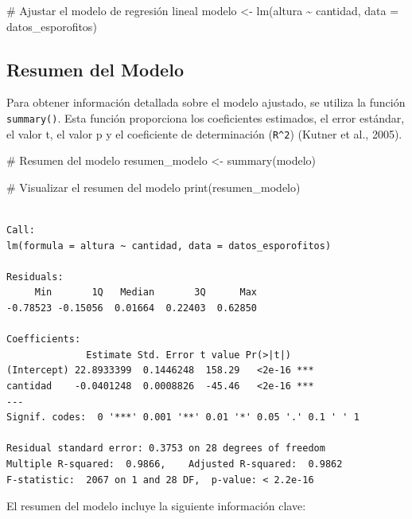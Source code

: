 \documentclass[
  spanish,
  a4paper,
  DIV=11,
  numbers=noendperiod,
  onepage,
  openany]{scrreprt}
\newenvironment{Shaded}{\begin{snugshade}}{\end{snugshade}}
\newcommand{\AttributeTok}[1]{\textcolor[rgb]{0.40,0.45,0.13}{#1}}
\newcommand{\CommentTok}[1]{\textcolor[rgb]{0.37,0.37,0.37}{#1}}
\newcommand{\FunctionTok}[1]{\textcolor[rgb]{0.28,0.35,0.67}{#1}}
\newcommand{\NormalTok}[1]{\textcolor[rgb]{0.00,0.23,0.31}{#1}}
\newcommand{\OtherTok}[1]{\textcolor[rgb]{0.00,0.23,0.31}{#1}}
\newcommand{\SpecialCharTok}[1]{\textcolor[rgb]{0.37,0.37,0.37}{#1}}
\begin{document}
\begin{Shaded}
\begin{Highlighting}[]
\CommentTok{\# Ajustar el modelo de regresión lineal}
\NormalTok{modelo }\OtherTok{\textless{}{-}} \FunctionTok{lm}\NormalTok{(altura }\SpecialCharTok{\textasciitilde{}}\NormalTok{ cantidad, }\AttributeTok{data =}\NormalTok{ datos\_esporofitos)}
\end{Highlighting}
\end{Shaded}

\subsection{Resumen del Modelo}\label{resumen-del-modelo}

Para obtener información detallada sobre el modelo ajustado, se utiliza
la función \texttt{summary()}. Esta función proporciona los coeficientes
estimados, el error estándar, el valor t, el valor p y el coeficiente de
determinación (\texttt{R\^{}2}) (Kutner et al., 2005).

\begin{Shaded}
\begin{Highlighting}[]
\CommentTok{\# Resumen del modelo}
\NormalTok{resumen\_modelo }\OtherTok{\textless{}{-}} \FunctionTok{summary}\NormalTok{(modelo)}

\CommentTok{\# Visualizar el resumen del modelo}
\FunctionTok{print}\NormalTok{(resumen\_modelo)}
\end{Highlighting}
\end{Shaded}

\begin{verbatim}

Call:
lm(formula = altura ~ cantidad, data = datos_esporofitos)

Residuals:
     Min       1Q   Median       3Q      Max 
-0.78523 -0.15056  0.01664  0.22403  0.62850 

Coefficients:
              Estimate Std. Error t value Pr(>|t|)    
(Intercept) 22.8933399  0.1446248  158.29   <2e-16 ***
cantidad    -0.0401248  0.0008826  -45.46   <2e-16 ***
---
Signif. codes:  0 '***' 0.001 '**' 0.01 '*' 0.05 '.' 0.1 ' ' 1

Residual standard error: 0.3753 on 28 degrees of freedom
Multiple R-squared:  0.9866,    Adjusted R-squared:  0.9862 
F-statistic:  2067 on 1 and 28 DF,  p-value: < 2.2e-16
\end{verbatim}

El resumen del modelo incluye la siguiente información clave:
\end{document}
